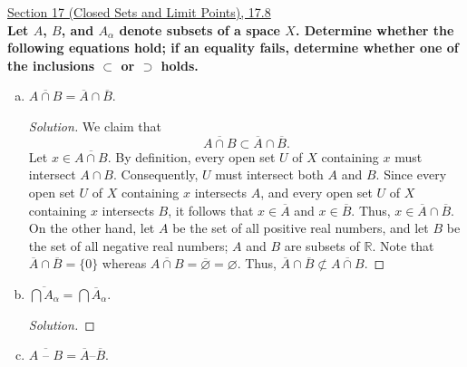 \documentclass[11pt]{article}
\newcommand{\R}{\mathbb{R}}
\newenvironment{solution}
  {\renewcommand\qedsymbol{$\blacksquare$}\begin{proof}[Solution]}
  {\end{proof}}
\begin{document}
\underline{Section 17 (Closed Sets and Limit Points), 17.8} \\

\textbf{Let $A$, $B$, and $A_\alpha$ denote subsets of a space $X$. Determine whether the following equations hold; if an equality fails, determine whether
one of the inclusions $\subset$ or $\supset$ holds.}

\begin{enumerate}[a)]
	\item $\overline{A \cap B} = \overline{A} \cap \overline{B}$.
	
	\begin{solution}
	We claim that 
	\[
		\boxed{\overline{A \cap B} \subset \overline{A} \cap \overline{B}}.
	\] 
	Let $x \in \overline{A \cap B}$. By definition, every open set $U$ of $X$ containing $x$
	must intersect $A \cap B$. Consequently, $U$ must intersect both $A$ and $B$. Since every open set $U$ of $X$ containing $x$ intersects $A$, and every open set $U$ of $X$ containing $x$ intersects $B$, it follows
	that $x \in \overline{A}$ and $x \in \overline{B}$. Thus, $x \in \overline{A} \cap \overline{B}$. \\

	On the other hand, let $A$ be the set of all positive real numbers, and let $B$ be the set of all negative real numbers; $A$ and $B$ are subsets of $\R$. Note that
	$\overline{A} \cap \overline{B} = \{ 0 \}$ whereas $\overline{A \cap B} = \overline{\varnothing} = \varnothing$. Thus, $\overline{A} \cap \overline{B} \not\subset \overline{A \cap B}$.
	\end{solution}

	\item $\overline{\bigcap A_\alpha} = \bigcap \overline{A}_\alpha$.
	
	\begin{solution}
		
	\end{solution}
	\item $\overline{A \text{ -- } B} = \overline{A} \text{--} \overline{B}$. 
\end{enumerate}
\end{document}
